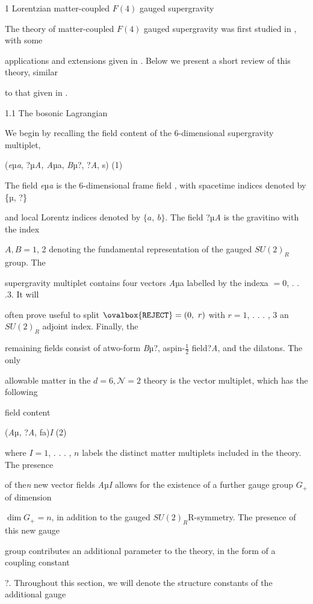 \documentclass[a4paper,12pt]{article}
\begin{document}
1 Lorentzian matter-coupled $F(4)$ gauged supergravity

The theory of matter-coupled $F(4)$ gauged supergravity was first studied in , with some

applications and extensions given in . Below we present a short review of this theory, similar

to that given in .

1.1 The bosonic Lagrangian

We begin by recalling the field content of the 6-dimensional supergravity multiplet,

({\it e}µ{\it a}, ?µ{\it A, A}µa, {\it B}µ?, ?{\it A}, s) (1)

The field {\it e}µ{\it a} is the 6-dimensional frame field , with spacetime indices denoted by \{µ, ?\}

and local Lorentz indices denoted by $\{a,\ b\}$. The field ?µ{\it A} is the gravitino with the index

$A, B = 1$, 2 denoting the fundamental representation of the gauged $SU(2)_{R}$ group. The

supergravity multiplet contains four vectors {\it A}µa labelled by the indexa $= 0$, . . .3. It will

often prove useful to split $\ovalbox{\tt\small REJECT}=(0,\ r)$ with $r=1$, . . . , 3 an $SU(2)_{R}$ adjoint index. Finally, the

remaining fields consist of atwo-form {\it B}µ?, aspin-$\displaystyle \frac{1}{2}$ field?{\it A}, and the dilatons. The only

allowable matter in the $d=6, \mathcal{N}=2$ theory is the vector multiplet, which has the following

field content

({\it A}µ, ?{\it A}, fa){\it I} (2)

where $I=1$, . . . , $n$ labels the distinct matter multiplets included in the theory. The presence

of the{\it n} new vector fields {\it A}µ{\it I} allows for the existence of a further gauge group $G_{+}$ of dimension

$\dim G_{+}=n$, in addition to the gauged $SU(2)_{R}\mathrm{R}$-symmetry. The presence of this new gauge

group contributes an additional parameter to the theory, in the form of a coupling constant

?. Throughout this section, we will denote the structure constants of the additional gauge
\end{document}

